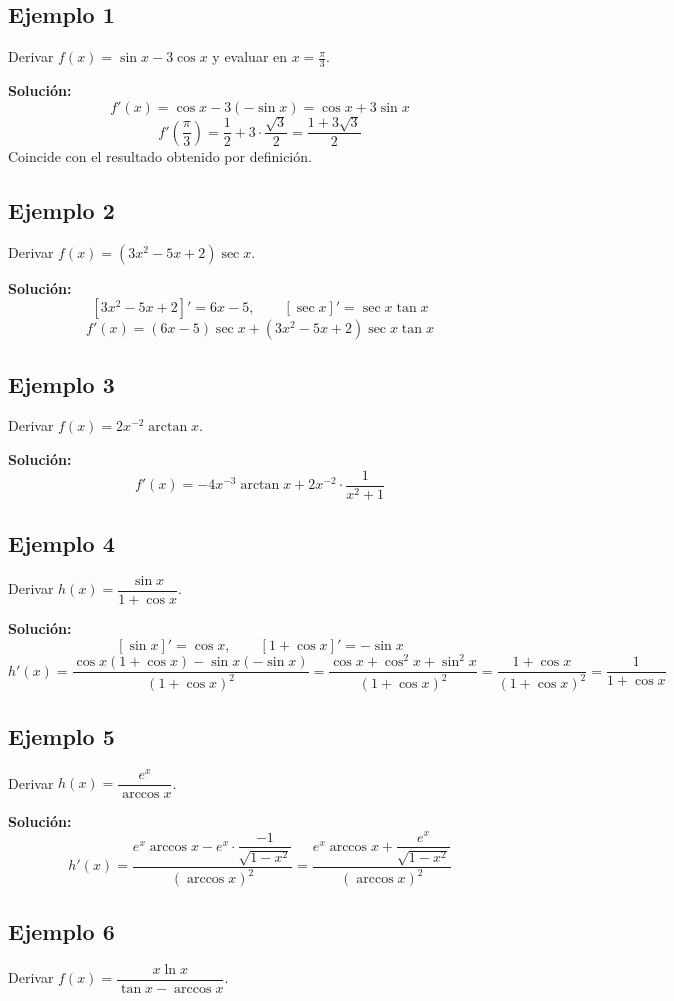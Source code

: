 \documentclass[12pt]{article}
\begin{document}
\subsection{Ejemplo 1}
Derivar $f(x) = \sin x - 3\cos x$ y evaluar en $x = \frac{\pi}{3}$.

\textbf{Solución:}
\[
f'(x) = \cos x - 3(-\sin x) = \cos x + 3\sin x
\]
\[
f'\left(\frac{\pi}{3}\right) = \frac{1}{2} + 3 \cdot \frac{\sqrt{3}}{2} = \frac{1 + 3\sqrt{3}}{2}
\]
Coincide con el resultado obtenido por definición.

\subsection{Ejemplo 2}
Derivar $f(x) = (3x^2 - 5x + 2) \sec x$.

\textbf{Solución:}
\[
[3x^2 - 5x + 2]' = 6x - 5, \qquad [\sec x]' = \sec x \tan x
\]
\[
f'(x) = (6x - 5)\sec x + (3x^2 - 5x + 2)\sec x \tan x
\]

\subsection{Ejemplo 3}
Derivar $f(x) = 2x^{-2} \arctan x$.

\textbf{Solución:}
\[
f'(x) = -4x^{-3} \arctan x + 2x^{-2} \cdot \frac{1}{x^2 + 1}
\]

\subsection{Ejemplo 4}
Derivar $h(x) = \dfrac{\sin x}{1 + \cos x}$.

\textbf{Solución:}
\[
[\sin x]' = \cos x, \qquad [1 + \cos x]' = -\sin x
\]
\[
h'(x) = \frac{\cos x (1 + \cos x) - \sin x(-\sin x)}{(1 + \cos x)^2} = \frac{\cos x + \cos^2 x + \sin^2 x}{(1 + \cos x)^2} = \frac{1 + \cos x}{(1 + \cos x)^2} = \frac{1}{1 + \cos x}
\]

\subsection{Ejemplo 5}
Derivar $h(x) = \dfrac{e^x}{\arccos x}$.

\textbf{Solución:}
\[
h'(x) = \frac{e^x \arccos x - e^x \cdot \dfrac{-1}{\sqrt{1 - x^2}}}{(\arccos x)^2} = \frac{e^x \arccos x + \dfrac{e^x}{\sqrt{1 - x^2}}}{(\arccos x)^2}
\]

\subsection{Ejemplo 6}
Derivar $f(x) = \dfrac{x \ln x}{\tan x - \arccos x}$.
\end{document}

